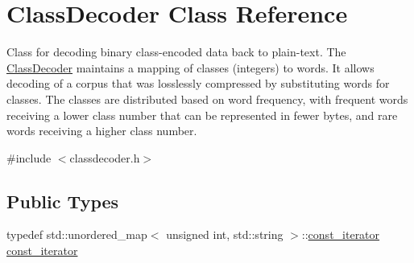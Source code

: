 \hypertarget{classClassDecoder}{}\section{Class\+Decoder Class Reference}
\label{classClassDecoder}


Class for decoding binary class-\/encoded data back to plain-\/text. The \hyperlink{classClassDecoder}{Class\+Decoder} maintains a mapping of classes (integers) to words. It allows decoding of a corpus that was losslessly compressed by substituting words for classes. The classes are distributed based on word frequency, with frequent words receiving a lower class number that can be represented in fewer bytes, and rare words receiving a higher class number.  




{\ttfamily \#include $<$classdecoder.\+h$>$}

\subsection*{Public Types}
\begin{DoxyCompactItemize}
\item 
typedef std\+::unordered\+\_\+map$<$ unsigned int, std\+::string $>$\+::\hyperlink{classClassDecoder_a24770930683eb9829a898343fe016929}{const\+\_\+iterator} \hyperlink{classClassDecoder_a24770930683eb9829a898343fe016929}{const\+\_\+iterator}
\end{DoxyCompactItemize}
